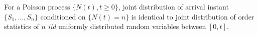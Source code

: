\documentclass[a4paper,10pt,english]{article}
\begin{document}
\begin{prop}%
For a Poisson process $\{N(t), t\geqslant 0\}$, joint distribution of arrival instant $\{S_1, \ldots, S_n\}$ conditioned on $\{N(t)=n\}$ is identical to joint distribution of order statistics of $n$ \textit{iid} uniformly distributed random variables between $[0,t]$.
\end{prop}
\end{document}
